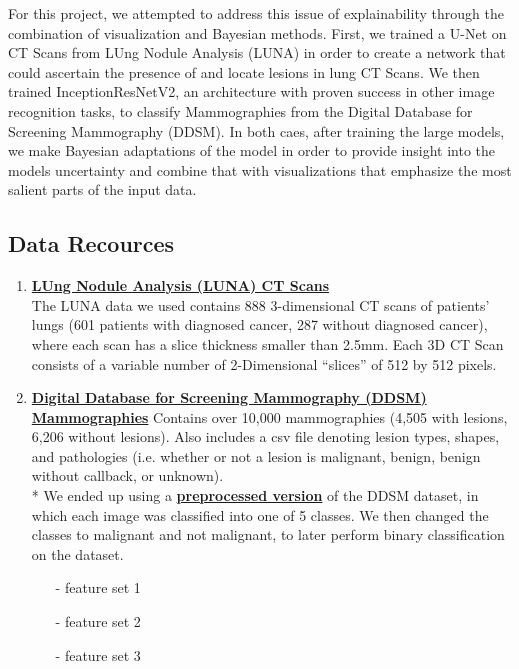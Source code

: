 \documentclass[12pt]{article}
\begin{document}
{For this project, we attempted to address this issue of explainability through the combination of visualization and Bayesian methods. First, we trained a U-Net on CT Scans from LUng Nodule Analysis (LUNA) in order to create a network that could ascertain the presence of and locate lesions in lung CT Scans. We then trained InceptionResNetV2, an architecture with proven success in other image recognition tasks, to classify Mammographies from the Digital Database for Screening Mammography (DDSM). In both caes, after training the large models, we make Bayesian adaptations of the model in order to provide insight into the models uncertainty and combine that with visualizations that emphasize the most salient parts of the input data.

\subsection*{Data Recources}

\begin{enumerate}
\item \textbf{\href{https://wiki.cancerimagingarchive.net/display/Public/LIDC-IDRI}{LUng Nodule Analysis (LUNA) CT Scans}}\\
The LUNA data we used contains 888 3-dimensional CT scans of patients' lungs (601 patients with diagnosed cancer, 287 without diagnosed cancer), where each scan has a slice thickness smaller than 2.5mm. Each 3D CT Scan consists of a variable number of 2-Dimensional ``slices'' of 512 by 512 pixels. 

\item \textbf{\href{https://www.ncbi.nlm.nih.gov/pmc/articles/PMC3041807}{Digital Database for Screening Mammography (DDSM) Mammographies}}
Contains over 10,000 mammographies (4,505 with lesions, 6,206 without lesions). Also includes a csv file denoting lesion types, shapes, and pathologies (i.e. whether or not a lesion is malignant, benign, benign without callback, or unknown). \\
* We ended up using a \textbf{\href{https://www.dropbox.com/sh/zxddynmk296frrq/AAD229pMOtKRTlWqB3xI1NSKa}{preprocessed version}} of the DDSM dataset, in which each image was classified into one of 5 classes. We then changed the classes to malignant and not malignant, to later perform binary classification on the dataset. 

\begin{itemize}
\item[-] feature set 1
\item[-] feature set 2
\item[-] feature set 3
\end{itemize}
\end{enumerate}

}
\end{document}
